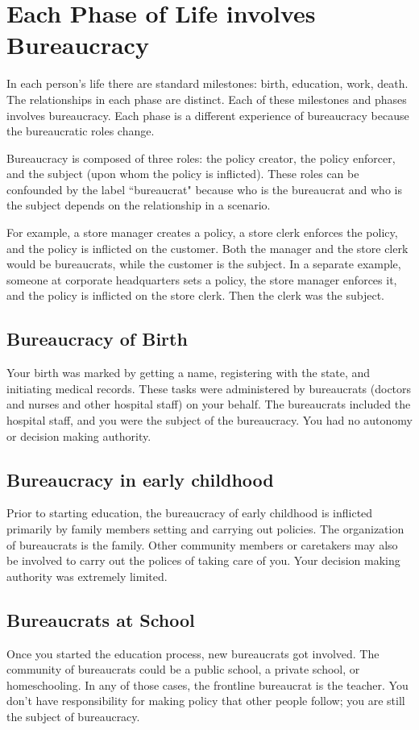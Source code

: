 \section{Each Phase of Life involves Bureaucracy}
In each person's life there are standard milestones: birth, education, work, death. 
The relationships in each phase are distinct.
Each of these milestones and phases involves bureaucracy. Each phase is a different experience of bureaucracy because the bureaucratic roles change.

Bureaucracy is composed of three roles: the policy creator, the policy enforcer, and the subject (upon whom the policy is inflicted). These roles can be confounded by the label ``bureaucrat" because who is the bureaucrat and who is the subject depends on the relationship in a scenario. 

For example, a store manager creates a policy, a store clerk enforces the policy, and the policy is inflicted on the customer. Both the manager and the store clerk would be bureaucrats, while the customer is the subject. In a separate example, someone at corporate headquarters sets a policy, the store manager enforces it, and the policy is inflicted on the store clerk. Then the clerk was the subject. 


\subsection{Bureaucracy of Birth\label{sec:bureacracy-of-birth}}
Your birth was marked by getting a name, registering with the state, and initiating medical records. These tasks were administered by bureaucrats (doctors and nurses and other hospital staff) on your behalf. The bureaucrats included the hospital staff, and you were the subject of the bureaucracy. You had no autonomy or decision making authority. 

\subsection{Bureaucracy in early childhood\label{sec:bureaucracy-early-childhood}}
Prior to starting education, the bureaucracy of early childhood is inflicted primarily by family members setting and carrying out policies. The organization of bureaucrats is the family. Other community members or caretakers may also be involved to carry out the polices of taking care of you. Your decision making authority was extremely limited. 

\subsection{Bureaucrats at School\label{sec:bureaucracy-of-school}}
Once you started the education process, new bureaucrats got involved.  The community of bureaucrats could be a public school, a private school, or homeschooling. In any of those cases, the frontline bureaucrat is the teacher. You don't have responsibility for making policy that other people follow; you are still the subject of bureaucracy.


